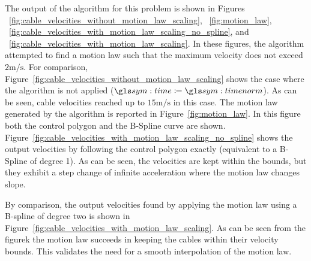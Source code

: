 	The output of the algorithm for this problem is shown in
	Figures
	~\ref{fig:cable_velocities_without_motion_law_scaling},
	~\ref{fig:motion_law},
	~\ref{fig:cable_velocities_with_motion_law_scaling_no_spline},
	and
	~\ref{fig:cable_velocities_with_motion_law_scaling}.
	In these figures, the algorithm attempted to find a motion law such that the
	maximum velocity does not exceed $2\si{\meter\per\second}$. For comparison,
	Figure~\ref{fig:cable_velocities_without_motion_law_scaling} shows the case
	where the algorithm is not applied ($\timesym \defeq \timenorm$). As can be
	seen, cable velocities reached up to $15\si{\meter\per\second}$ in this
	case. The motion law generated by the algorithm is reported in
	Figure~\ref{fig:motion_law}. In this figure both the control polygon and the
	B-Spline curve are shown.
	Figure~\ref{fig:cable_velocities_with_motion_law_scaling_no_spline} shows
	the output velocities by following the control polygon exactly (equivalent
	to a B-Spline of degree 1). As can be seen, the velocities are kept within
	the bounds, but they exhibit a step change of infinite acceleration where
	the motion law changes slope.

	By comparison, the output velocities found by applying the motion law using
	a B-spline of degree two is shown in
	Figure~\ref{fig:cable_velocities_with_motion_law_scaling}. As can be seen
	from the figurek the motion law succeeds in keeping the cables within their
	velocity bounds. This validates the need for a smooth interpolation of the
	motion law.

